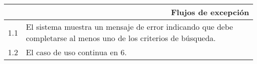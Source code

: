 \begin{tabularx}{\textwidth}{| r | X |}
\hline
\multicolumn{2}{|X|}{
\textbf{Flujos de excepción}} \\

\hline
1.1 & El sistema muestra un mensaje de error indicando que debe completarse al
menos uno de los criterios de búsqueda. \\
\hline
1.2 & El caso de uso continua en 6. \\


\hline
\end{tabularx}


